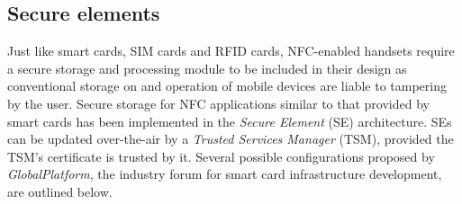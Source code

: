 
\subsection{Secure elements}
Just like smart cards, SIM cards and RFID cards, NFC-enabled handsets require a secure storage and processing module to be included in their design as conventional storage on and operation of mobile devices are liable to tampering by the user.
Secure storage for NFC applications similar to that provided by smart cards has been implemented in the \textit{Secure Element} (SE) architecture.
SEs can be updated over-the-air by a \textit{Trusted Services Manager} (TSM), provided the TSM's certificate is trusted by it.
Several possible configurations proposed by \textit{GlobalPlatform}, the industry forum for smart card infrastructure development, are outlined below. \cite{Reveilhac:2009:PSE:1548884.1549404,GlobalPlatformSEs}






